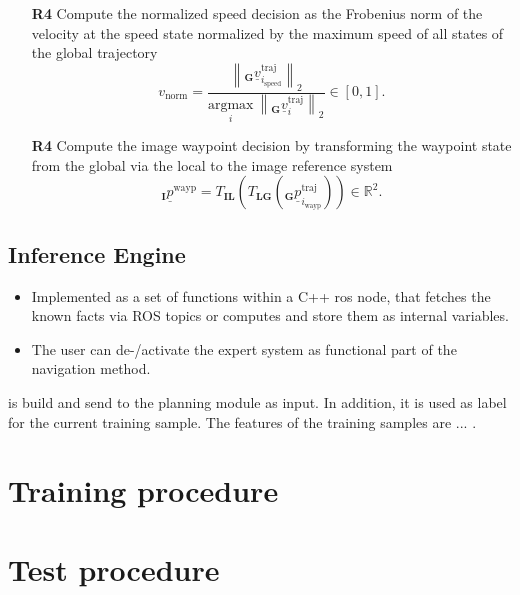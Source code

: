 \begin{itemize}
    


    \item [\textbf{R4}] Compute the normalized speed decision
    as the Frobenius norm of the velocity at the speed state
    normalized by the maximum speed of all states of the global trajectory
    \begin{equation}
        v_\text{norm} 
        = 
        \frac{
            \left\| 
                {}_\textbf{G} \underline v^\text{traj}_{i_\text{speed}} 
            \right\|_2
        }
        {
            \underset{i}{\mathrm{argmax}}\  
            \left\| 
                {}_\textbf{G} \underline v^\text{traj}_i
            \right\|_2
        }  
        \in [0,1].
    \end{equation}


    
    
    
    \item [\textbf{R4}] Compute the image waypoint decision
    by transforming the waypoint state 
    from the global 
    via the local
    to the image reference system
    \begin{equation}
        {}_\textbf{I} \underline p^\text{wayp}
        =
        T_\textbf{IL} \left( 
            T_\textbf{LG} \left( 
                {}_\textbf{G} \underline p^\text{traj}_{i_\text{wayp}} 
            \right)
        \right) \in \mathbb{R}^2.
    \end{equation}

    
    

    

\end{itemize}





\subsection*{Inference Engine}
\begin{itemize}
	\item Implemented as a set of functions within a C++ ros node, that fetches the known facts via ROS topics or computes and store them as internal variables.
	\item The user can de-/activate the expert system as functional part of the navigation method.
\end{itemize} 
is build and send to the planning module as input.
In addition, it is used as label for the current training sample.
The features of the training samples are ... .



\section{Training procedure}


\section{Test procedure}








